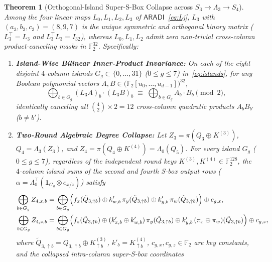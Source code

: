 \documentclass[11pt,a4paper]{article}
\newtheorem{theorem}{Theorem}
\theoremstyle{definition}
\theoremstyle{remark}
\newcommand{\Ftwo}{\mathbb{F}_2}
\newcommand{\ARADI}{\mathsf{ARADI}}
\begin{document}
\begin{theorem}[Orthogonal-Island Super-S-Box Collapse across $S_3 \to \Lambda_3 \to S_4$]
\label{thm:orth-collapse}
Among the four linear maps $L_0, L_1, L_2, L_3$ of $\ARADI$~\eqref{eq:Lj}, $L_3$ with $(a_3, b_3, c_3) = (8, 9, 7)$ is the \emph{unique} symmetric and orthogonal binary matrix ($L_3^\top = L_3$ and $L_3^\top L_3 = I_{32}$), whereas $L_0, L_1, L_2$ admit zero non-trivial cross-column product-canceling masks in $\Ftwo^{32}$. Specifically:
\begin{enumerate}[leftmargin=1.8em]
    \item \textbf{Island-Wise Bilinear Inner-Product Invariance:} On each of the eight disjoint $4$-column islands $G_g \subset \{0,\dots,31\}$ ($0 \le g \le 7$) in~\eqref{eq:islands}, for any Boolean polynomial vectors $A, B \in \bigl(\Ftwo[u_0,\dots,u_{d-1}]\bigr)^{32}$,
    \begin{equation}
    \label{eq:orth-cancel}
    \bigoplus_{b \in G_g} (L_3 A)_b \cdot (L_3 B)_b \;\equiv\; \bigoplus_{b \in G_g} A_b \cdot B_b \pmod 2,
    \end{equation}
    identically canceling all $\binom{4}{2} \times 2 = 12$ cross-column quadratic products $A_b B_{b'}$ ($b \neq b'$).
    \item \textbf{Two-Round Algebraic Degree Collapse:} Let $Z_3 = \pi(Q_3 \oplus K^{(3)})$, $Q_4 = \Lambda_3(Z_3)$, and $Z_4 = \pi(Q_4 \oplus K^{(4)}) = \Lambda_0(Q_5)$. For every island $G_g$ ($0 \le g \le 7$), regardless of the independent round keys $K^{(3)}, K^{(4)} \in \Ftwo^{128}$, the $4$-column island sums of the second and fourth S-box output rows ($\alpha = \Lambda_0^\top(\mathbf{1}_{G_g} \otimes e_{x/z})$) satisfy
    \begin{equation}
    \label{eq:collapse}
    \begin{aligned}
    \bigoplus_{b \in G_g} Z_{4,x,b} &= \bigoplus_{b \in G_g} \Bigl(f_x(\tilde{Q}_{3,\uparrow b}) \oplus k'_{w,b}\,\pi_y(\tilde{Q}_{3,\uparrow b}) \oplus k'_{y,b}\,\pi_w(\tilde{Q}_{3,\uparrow b})\Bigr) \oplus c_{g,x}, \\
    \bigoplus_{b \in G_g} Z_{4,z,b} &= \bigoplus_{b \in G_g} \Bigl(f_z(\tilde{Q}_{3,\uparrow b}) \oplus (k'_{x,b}\oplus k'_{w,b})\,\pi_y(\tilde{Q}_{3,\uparrow b}) \oplus k'_{y,b}\,(\pi_x \oplus \pi_w)(\tilde{Q}_{3,\uparrow b})\Bigr) \oplus c_{g,z},
    \end{aligned}
    \end{equation}
    where $\tilde{Q}_{3,\uparrow b} = Q_{3,\uparrow b} \oplus K^{(3)}_{\uparrow b}$, $k'_b = K^{(4)}_{\uparrow b}$, $c_{g,x}, c_{g,z} \in \Ftwo$ are key constants, and the collapsed intra-column super-S-box coordinates

\end{enumerate}
\end{theorem}
\end{document}
